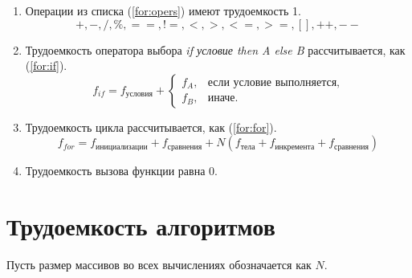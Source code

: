 \begin{enumerate}
	\item Операции из списка (\ref{for:opers}) имеют трудоемкость 1.
	\begin{equation}
		\label{for:opers}
		+, -, /, \%, ==, !=, <, >, <=, >=, [], ++, {-}-
	\end{equation}
	\item Трудоемкость оператора выбора \textit{if условие then A else B} рассчитывается, как (\ref{for:if}).
	\begin{equation}
		\label{for:if}
		f_{if} = f_{\text{условия}} +
		\begin{cases}
			f_A, & \text{если условие выполняется,}\\
			f_B, & \text{иначе.}
		\end{cases}
	\end{equation}
	\item Трудоемкость цикла рассчитывается, как (\ref{for:for}).
	\begin{equation}
		\label{for:for}
		f_{for} = f_{\text{инициализации}} + f_{\text{сравнения}} + N(f_{\text{тела}} + f_{\text{инкремента}} + f_{\text{сравнения}})
	\end{equation}
	\item Трудоемкость вызова функции равна 0.
\end{enumerate}

\section{Трудоемкость алгоритмов}

Пусть размер массивов во всех вычислениях обозначается как $N$.

